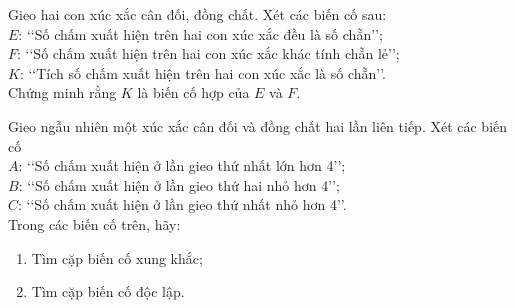\begin{bt}[Mức 2]%
	Gieo hai con xúc xắc cân đối, đồng chất. Xét các biến cố sau:\\
	$E$: \lq\lq Số chấm xuất hiện trên hai con xúc xắc đều là số chẵn\rq\rq;\\
	$F$: \lq\lq Số chấm xuất hiện trên hai con xúc xắc khác tính chẵn lẻ\rq\rq;\\
	$K$: \lq\lq Tích số chấm xuất hiện trên hai con xúc xắc là số chẵn\rq\rq.\\
	Chứng minh rằng $K$ là biến cố hợp của $E$ và $F$.
\end{bt}

\begin{bt}[CD, mức 2]%
	Gieo ngẫu nhiên một xúc xắc cân đối và đồng chất hai lần liên tiếp. Xét các biến cố\\
	$A$: \lq\lq Số chấm xuất hiện ở lần gieo thứ nhất lớn hơn 4\rq\rq ;\\
	$B$: \lq\lq Số chấm xuất hiện ở lần gieo thứ hai nhỏ hơn 4\rq\rq ;\\
	$C$: \lq\lq Số chấm xuất hiện ở lần gieo thứ nhất nhỏ hơn 4\rq\rq.\\
	Trong các biến cố trên, hãy:
	\begin{enumerate}
		\item Tìm cặp biến cố xung khắc;
		\item Tìm cặp biến cố độc lập.
	\end{enumerate}
\end{bt}

